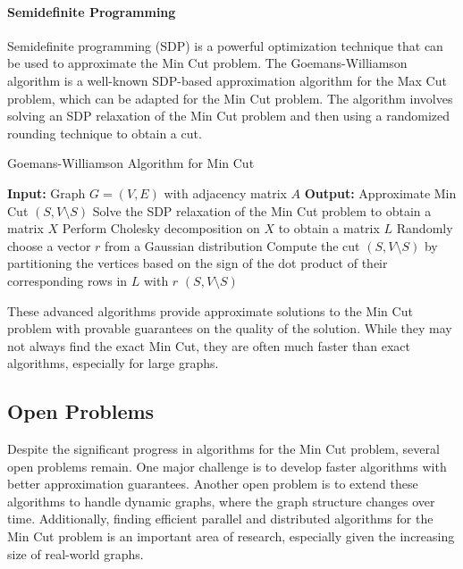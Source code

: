 \documentclass[12pt]{article}
\begin{document}
\paragraph{Semidefinite Programming}

Semidefinite programming (SDP) is a powerful optimization technique that can be used to approximate the Min Cut problem. The Goemans-Williamson algorithm is a well-known SDP-based approximation algorithm for the Max Cut problem, which can be adapted for the Min Cut problem. The algorithm involves solving an SDP relaxation of the Min Cut problem and then using a randomized rounding technique to obtain a cut.

\begin{algorithm}
\caption{Goemans-Williamson Algorithm for Min Cut}
\label{alg:goemans-williamson}
\begin{algorithmic}
    \STATE \textbf{Input:} Graph $G=(V,E)$ with adjacency matrix $A$
    \STATE \textbf{Output:} Approximate Min Cut $(S, V \setminus S)$
    \STATE Solve the SDP relaxation of the Min Cut problem to obtain a matrix $X$
    \STATE Perform Cholesky decomposition on $X$ to obtain a matrix $L$
    \STATE Randomly choose a vector $r$ from a Gaussian distribution
    \STATE Compute the cut $(S, V \setminus S)$ by partitioning the vertices based on the sign of the dot product of their corresponding rows in $L$ with $r$
    \RETURN $(S, V \setminus S)$
\end{algorithmic}
\end{algorithm}

These advanced algorithms provide approximate solutions to the Min Cut problem with provable guarantees on the quality of the solution. While they may not always find the exact Min Cut, they are often much faster than exact algorithms, especially for large graphs.

\subsection{Open Problems}

Despite the significant progress in algorithms for the Min Cut problem, several open problems remain. One major challenge is to develop faster algorithms with better approximation guarantees. Another open problem is to extend these algorithms to handle dynamic graphs, where the graph structure changes over time. Additionally, finding efficient parallel and distributed algorithms for the Min Cut problem is an important area of research, especially given the increasing size of real-world graphs.



\end{document}
